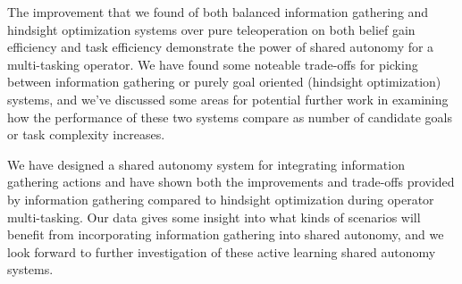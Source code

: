 \documentclass[conference]{IEEEtran}
\begin{document}
The improvement that we found of both balanced information gathering and hindsight optimization systems over pure teleoperation on both belief gain efficiency and task efficiency demonstrate the power of shared autonomy for a multi-tasking operator. We have found some noteable trade-offs for picking between information gathering or purely goal oriented (hindsight optimization) systems, and we've discussed some areas for potential further work in examining how the performance of these two systems compare as number of candidate goals or task complexity increases.

We have designed a shared autonomy system for integrating information gathering actions and have shown both the improvements and trade-offs provided by information gathering compared to hindsight optimization during operator multi-tasking. Our data gives some insight into what kinds of scenarios will benefit from incorporating information gathering into shared autonomy, and we look forward to further investigation of these active learning shared autonomy systems.  



\end{document}
